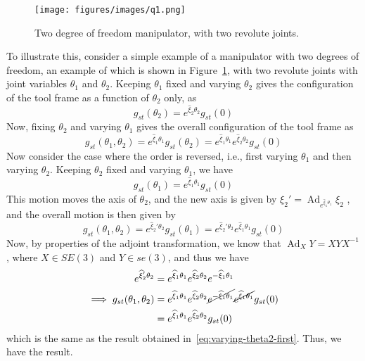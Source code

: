 \newpage
\begin{figure}[htb]
    \centering
    \texttt{[image: figures/images/q1.png]}
    \caption{
        Two degree of freedom manipulator, with two revolute joints.
    }\label{fig:2dof-manipulator}
\end{figure}

To illustrate this, consider a simple example of a manipulator with two degrees of freedom, an example of which is shown in Figure~\ref{fig:2dof-manipulator}, with two revolute joints with joint variables \( \theta_1 \) and \( \theta_2 \).
Keeping \( \theta_1 \) fixed and varying \( \theta_2 \) gives the configuration of the tool frame as a function of \( \theta_2 \) only, as
\begin{equation*}
    g_{st}(\theta_2)
    =
    e^{\widehat{\xi}_2 \theta_2}
    g_{st}(0)
\end{equation*}
Now, fixing \( \theta_2 \) and varying \( \theta_1 \) gives the overall configuration of the tool frame as
\begin{equation}\label{eq:varying-theta2-first}
    g_{st}(\theta_1, \theta_2)
    =
    e^{\widehat{\xi}_1 \theta_1}
    g_{st}(\theta_2)
    =
    e^{\widehat{\xi}_1 \theta_1}
    e^{\widehat{\xi}_2 \theta_2}
    g_{st}(0)
\end{equation}
Now consider the case where the order is reversed, i.e., first varying \( \theta_1 \) and then varying \( \theta_2 \).
Keeping \( \theta_2 \) fixed and varying \( \theta_1 \), we have
\begin{equation*}
    g_{st}(\theta_1)
    =
    e^{\widehat{\xi}_1 \theta_1}
    g_{st}(0)
\end{equation*}
This motion moves the axis of \( \theta_2 \), and the new axis is given by
\(
\displaystyle
\xi_2'
=
\operatorname{Ad}_{e^{\widehat{\xi}_1 \theta_1}} \xi_2
\)
, and the overall motion is then given by
\begin{equation*}
    g_{st}(\theta_1, \theta_2)
    =
    e^{\widehat{\xi}_2' \theta_2}
    g_{st}(\theta_1)
    =
    e^{\widehat{\xi}_2' \theta_2}
    e^{\widehat{\xi}_1 \theta_1}
    g_{st}(0)
\end{equation*}
Now, by properties of the adjoint transformation, we know that \( \operatorname{Ad}_X Y = X Y X^{-1} \), where \( X \in SE (3) \) and \( Y \in se (3) \), and thus we have
\begin{align*}
    e^{\widehat{\xi}_2' \theta_2}
     & =
    e^{\widehat{\xi}_1 \theta_1}
    e^{\widehat{\xi}_2 \theta_2}
    e^{-\widehat{\xi}_1 \theta_1}
    \\
    \implies
    g_{st}(\theta_1, \theta_2)
     & =
    e^{\widehat{\xi}_1 \theta_1}
    e^{\widehat{\xi}_2 \theta_2}
    \cancel{e^{-\widehat{\xi}_1 \theta_1}}
    \cancel{e^{\widehat{\xi}_1 \theta_1}}
    g_{st}(0)
    \nonumber
    \\ & =
    e^{\widehat{\xi}_1 \theta_1}
    e^{\widehat{\xi}_2 \theta_2}
    g_{st}(0)
\end{align*}
which is the same as the result obtained in~\eqref{eq:varying-theta2-first}.
Thus, we have the result.
